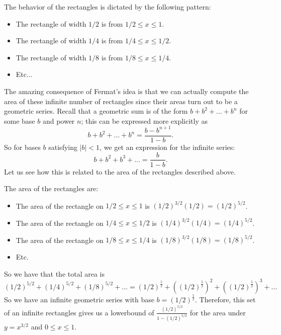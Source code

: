 The behavior of the rectangles is dictated by the following pattern:

\begin{itemize}
\item The rectangle of width \(1/2\) is from \(1/2 \leq x \leq 1\). 
\item The rectangle of width \(1/4\) is from \(1/4 \leq x \leq 1/2\).
\item The rectangle of width \(1/8\) is from \(1/8 \leq x \leq 1/4\). 
\item Etc...
\end{itemize}

The amazing consequence of Fermat's idea is that we can actually compute the area of these infinite number of rectangles since their areas turn out to be a geometric series.
Recall that a geometric sum is of the form \(b + b^2 + ... + b^n\) for some base \(b\) and power \(n\); this can be expressed more explicitly as
\begin{equation}
b + b^2 + ... + b^n = \frac{b - b^{n+1}}{1 - b}.
\end{equation}
So for bases \(b\) satisfying \(|b| < 1\), we get an expression for the infinite series:
\begin{equation}
b + b^2 + b^3 + ... = \frac{b}{1 - b}.
\end{equation}
Let us see how this is related to the area of the rectangles described above.

The area of the rectangles are:
\begin{itemize}
\item The area of the rectangle on \(1/2 \leq x \leq 1\) is \( (1/2)^{3/2} (1/2) = (1/2)^{5/2}\).
\item The area of the rectangle on \(1/4 \leq x \leq 1/2\) is \( (1/4)^{3/2} (1/4) = (1/4)^{5/2}\).
\item The area of the rectangle on \(1/8 \leq x \leq 1/4\) is \( (1/8)^{3/2} (1/8) = (1/8)^{5/2}\).
\item Etc.
\end{itemize}

So we have that the total area is 
\begin{equation}
(1/2)^{5/2} + (1/4)^{5/2} + (1/8)^{5/2} + ... 
    = (1/2)^{\frac{5}{2}} + \left((1/2)^{\frac{5}{2}}\right)^2 + \left((1/2)^{\frac{5}{2}}\right)^3 + ... 
\end{equation}
So we have an infinite geometric series with base \(b = (1/2)^{\frac{5}{2}}\). Therefore, this set of an infinite rectangles gives us a lowerbound
of \(\frac{(1/2)^{5/2}}{1 - (1/2)^{5/2}}\) for the area under \(y = x^{3/2}\) and \(0 \leq x \leq 1\).

